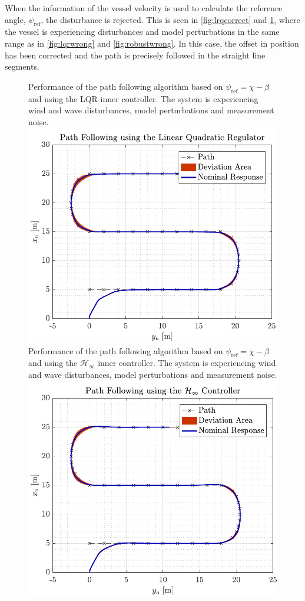 When the information of the vessel velocity is used to calculate the reference angle, $\psi_\mathrm{ref}$, the disturbance is rejected. This is seen in \autoref{fig:lrqcorrect} and \ref{fig:robustcorrect}, where the vessel is experiencing disturbances and model perturbations in the same range as in \autoref{fig:lqrwrong} and \ref{fig:robustwrong}. In this case, the offset in position has been corrected and the path is precisely followed in the straight line segments.
\begin{figure}[H]
	\captionbox  %
	{               %
		Performance of the path following algorithm based on $\psi_\mathrm{ref}=\chi-\beta$ and using the LQR inner controller. The system is experiencing wind and wave disturbances, model perturbations and measurement noise.                %
		\label{fig:lrqcorrect}                                  %
	}                                                                 %
	{                                                                  %
		\includegraphics[width=.45\textwidth]{figures/path_lqr}         %
	}                                                                    %
	\hspace{5pt}                                                          %
	\captionbox  %
	{       
		Performance of the path following algorithm based on $\psi_\mathrm{ref}=\chi-\beta$ and using the $\mathcal{H}_\infty$ inner controller. The system is experiencing wind and wave disturbances, model perturbations and measurement noise.                                                                   %
		\label{fig:robustcorrect}                                     %
	}                                                                           %
	{                                                                            %
		\includegraphics[width=.45\textwidth]{figures/path_rob}            %
	}                                                                             %
\end{figure}
